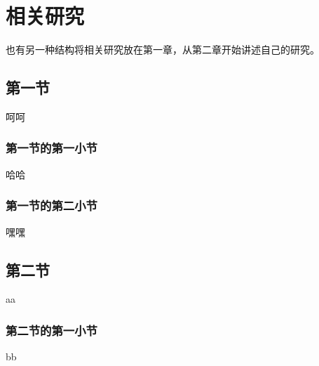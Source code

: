 
\chapter{相关研究}

也有另一种结构将相关研究放在第一章，从第二章开始讲述自己的研究。

\section{第一节}

呵呵

\subsection{第一节的第一小节}

哈哈

\subsection{第一节的第二小节}

嘿嘿

\section{第二节}

aa

\subsection{第二节的第一小节}

bb
